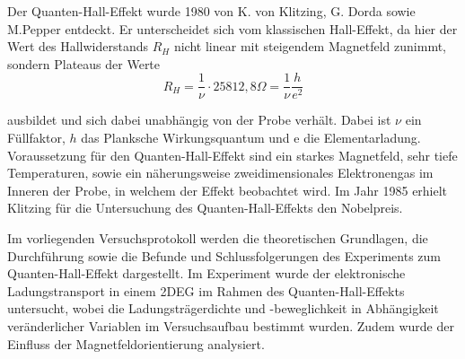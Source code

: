 

Der Quanten-Hall-Effekt wurde 1980 von K. von Klitzing, G. Dorda sowie M.Pepper entdeckt. Er unterscheidet sich vom klassischen Hall-Effekt, da hier der Wert des Hallwiderstands $R_H$ nicht linear mit steigendem Magnetfeld zunimmt, sondern Plateaus der Werte 
\begin{equation}
R_H=\frac{1}{\nu}\cdot 25812,8\Omega =\frac{1}{\nu} \frac{h}{e^2}
\end{equation}

ausbildet und sich dabei unabhängig von der Probe verhält. Dabei ist $\nu$ ein Füllfaktor, $h$ das Planksche Wirkungsquantum und e die Elementarladung. 
Voraussetzung für den Quanten-Hall-Effekt sind ein starkes Magnetfeld, sehr tiefe Temperaturen, sowie ein näherungsweise zweidimensionales Elektronengas im Inneren der Probe, in welchem der Effekt beobachtet wird.  
Im Jahr 1985 erhielt Klitzing für die Untersuchung des Quanten-Hall-Effekts den Nobelpreis. 

Im vorliegenden Versuchsprotokoll werden die theoretischen Grundlagen, die Durchführung sowie die Befunde und Schlussfolgerungen des Experiments zum Quanten-Hall-Effekt dargestellt.
Im Experiment wurde der elektronische Ladungstransport in einem 2DEG im Rahmen des Quanten-Hall-Effekts untersucht, wobei die Ladungsträgerdichte und -beweglichkeit in Abhängigkeit veränderlicher Variablen im Versuchsaufbau bestimmt wurden. Zudem wurde der Einfluss der Magnetfeldorientierung analysiert.

